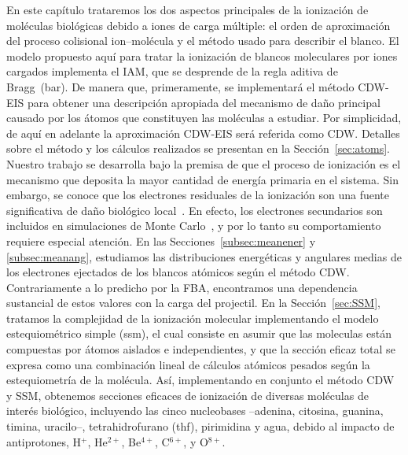 En este capítulo trataremos los dos aspectos principales de la ionización 
de moléculas biológicas debido a iones de carga múltiple: el orden de 
aproximación del proceso colisional ion--molécula y el método usado para 
describir el blanco. El modelo propuesto aquí para tratar la ionización 
de blancos moleculares por iones cargados implementa el IAM, que se 
desprende de la regla aditiva de Bragg~(\acs{bar}). De manera que, 
primeramente, se implementará el método CDW-EIS para obtener una 
descripción apropiada del mecanismo de daño principal causado por los 
átomos que constituyen las moléculas a estudiar. Por simplicidad, de aquí 
en adelante la aproximación CDW-EIS será referida como CDW. Detalles 
sobre el método y los cálculos realizados se presentan en la 
Sección~\ref{sec:atoms}. Nuestro trabajo se desarrolla bajo la premisa de 
que el proceso de ionización es el mecanismo que deposita la mayor 
cantidad de energía primaria en el sistema. Sin embargo, se conoce que 
los electrones residuales de la ionización son una fuente significativa 
de daño biológico local~\cite{Denifl:11}. En efecto, los electrones 
secundarios son incluidos en simulaciones de Monte 
Carlo~\cite{Champion:16,Quinto:17,Acocer-Avila:19}, y por lo tanto su 
comportamiento requiere especial atención. En las 
Secciones~\ref{subsec:meanener} y \ref{subsec:meanang}, estudiamos las 
distribuciones energéticas y angulares medias de los electrones ejectados 
de los blancos atómicos según el método CDW. Contrariamente a lo predicho 
por la FBA, encontramos una dependencia sustancial de estos valores con 
la carga del projectil. En la Sección~\ref{sec:SSM}, tratamos la 
complejidad de la ionización molecular implementando el modelo 
estequiométrico simple (\acs{ssm}), el cual consiste en asumir que las 
moleculas están compuestas por átomos aislados e independientes, y que la 
sección eficaz total se expresa como una combinación lineal de cálculos 
atómicos pesados según la estequiometría de la molécula. Así, 
implementando en conjunto el método CDW y SSM, obtenemos secciones 
eficaces de ionización de diversas moléculas de interés biológico, 
incluyendo las cinco nucleobases --adenina, citosina, guanina, timina, 
uracilo--, tetrahidrofurano (\acs{thf}), pirimidina y agua, debido al 
impacto de antiprotones, H$^{+}$, He$^{2+}$, Be$^{4+}$, C$^{6+}$, y 
O$^{8+}$. 

